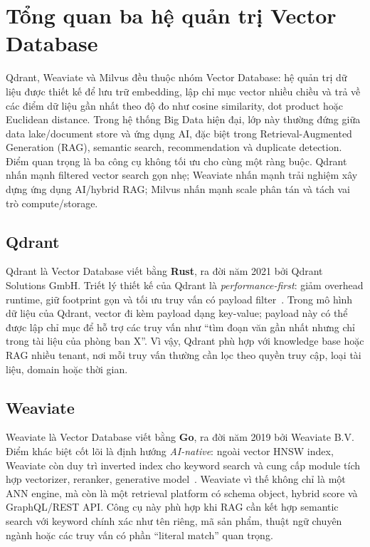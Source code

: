 \section{Tổng quan ba hệ quản trị Vector Database}
\label{sec:overview}

Qdrant, Weaviate và Milvus đều thuộc nhóm Vector Database: hệ quản trị dữ liệu được thiết kế để lưu trữ embedding, lập chỉ mục vector nhiều chiều và trả về các điểm dữ liệu gần nhất theo độ đo như cosine similarity, dot product hoặc Euclidean distance. Trong hệ thống Big Data hiện đại, lớp này thường đứng giữa data lake/document store và ứng dụng AI, đặc biệt trong Retrieval-Augmented Generation (RAG), semantic search, recommendation và duplicate detection. Điểm quan trọng là ba công cụ không tối ưu cho cùng một ràng buộc. Qdrant nhấn mạnh filtered vector search gọn nhẹ; Weaviate nhấn mạnh trải nghiệm xây dựng ứng dụng AI/hybrid RAG; Milvus nhấn mạnh scale phân tán và tách vai trò compute/storage.

\subsection{Qdrant}

Qdrant là Vector Database viết bằng \textbf{Rust}, ra đời năm 2021 bởi Qdrant Solutions GmbH. Triết lý thiết kế của Qdrant là \textit{performance-first}: giảm overhead runtime, giữ footprint gọn và tối ưu truy vấn có payload filter~\cite{qdrantdocs}. Trong mô hình dữ liệu của Qdrant, vector đi kèm payload dạng key-value; payload này có thể được lập chỉ mục để hỗ trợ các truy vấn như ``tìm đoạn văn gần nhất nhưng chỉ trong tài liệu của phòng ban X''. Vì vậy, Qdrant phù hợp với knowledge base hoặc RAG nhiều tenant, nơi mỗi truy vấn thường cần lọc theo quyền truy cập, loại tài liệu, domain hoặc thời gian.

\subsection{Weaviate}

Weaviate là Vector Database viết bằng \textbf{Go}, ra đời năm 2019 bởi Weaviate B.V. Điểm khác biệt cốt lõi là định hướng \textit{AI-native}: ngoài vector HNSW index, Weaviate còn duy trì inverted index cho keyword search và cung cấp module tích hợp vectorizer, reranker, generative model~\cite{weaviatedocs,weaviatemodules}. Weaviate vì thế không chỉ là một ANN engine, mà còn là một retrieval platform có schema object, hybrid score và GraphQL/REST API. Công cụ này phù hợp khi RAG cần kết hợp semantic search với keyword chính xác như tên riêng, mã sản phẩm, thuật ngữ chuyên ngành hoặc các truy vấn có phần ``literal match'' quan trọng.

